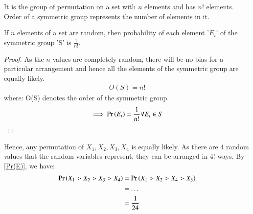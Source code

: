 \documentclass[journal,12pt,twocolumn]{IEEEtran}
\begin{document}
\begin{definition}
It is the group of permutation on a set with $n$ elements and has $n!$ elements. Order of a symmetric group represents the number of elements in it.
\end{definition}

\begin{lemma}
If $n$ elements of a set are random, then probability of each element '$E_i$' of the symmetric group 'S' is $\frac{1}{n!}$.
\end{lemma}
\begin{proof}
As the $n$ values are completely random, there will be no bias for a particular arrangement and hence all the elements of the symmetric group are equally likely.
\begin{align}
    O(S) = n!
\end{align}
where: O(S) denotes the order of the symmetric group.
\begin{align}
\implies \Pr\left(E_i\right) = \frac{1}{n!} \forall E_i \in S \label{Pr(E)}
\end{align}

\end{proof}
Hence, any permutation of $X_1,X_2,X_3,X_4$ is equally likely.
As there are 4 random values that the random variables represent, they can be arranged in 4! ways. By \eqref{Pr(E)}, we have:
\begin{align}
   \Pr\left(X_1>X_2>X_3>X_4\right) &= \Pr\left(X_1>X_2>X_4>X_3\right) \\&= \dots\\ &= \frac{1}{24}
\end{align}
\end{document}
